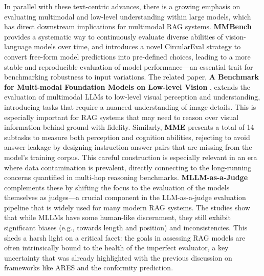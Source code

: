 \documentclass[11pt]{article}
\begin{document}
In parallel with these text-centric advances, there is a growing emphasis on evaluating multimodal and low-level understanding within large models, which has direct downstream implications for multimodal RAG systems. \textbf{MMBench} \cite{ref418} provides a systematic way to continuously evaluate diverse abilities of vision-language models over time, and introduces a novel CircularEval strategy to convert free-form model predictions into pre-defined choices, leading to a more stable and reproducible evaluation of model performance---an essential trait for benchmarking robustness to input variations. The related paper, \textbf{A Benchmark for Multi-modal Foundation Models on Low-level Vision} \cite{ref419}, extends the evaluation of multimodal LLMs to low-level visual perception and understanding, introducing tasks that require a nuanced understanding of image details. This is especially important for RAG systems that may need to reason over visual information behind ground with fidelity. Similarly, \textbf{MME} \cite{ref420} presents a total of 14 subtasks to measure both perception and cognition abilities, rejecting to avoid answer leakage by designing instruction-answer pairs that are missing from the model's training corpus. This careful construction is especially relevant in an era where data contamination is prevalent, directly connecting to the long-running concerns quantified in multi-hop reasoning benchmarks. \textbf{MLLM-as-a-Judge} \cite{ref421} complements these by shifting the focus to the evaluation of the models themselves as judges---a crucial component in the LLM-as-a-judge evaluation pipeline that is widely used for many modern RAG systems. The studies show that while MLLMs have some human-like discernment, they still exhibit significant biases (e.g., towards length and position) and inconsistencies. This sheds a harsh light on a critical facet: the goals in assessing RAG models are often intrinsically bound to the health of the imperfect evaluator, a key uncertainty that was already highlighted with the previous discussion on frameworks like ARES and the conformity prediction.
\end{document}
